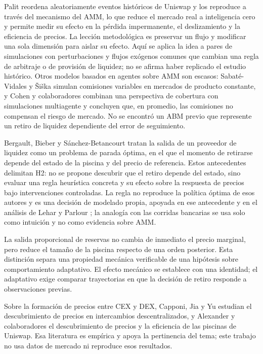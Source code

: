 Palit \cite{palit2022shuffled} reordena aleatoriamente eventos históricos de Uniswap y los reproduce a través del mecanismo del AMM, lo que reduce el mercado real a inteligencia cero y permite medir su efecto en la pérdida impermanente, el deslizamiento y la eficiencia de precios. La lección metodológica es preservar un flujo y modificar una sola dimensión para aislar su efecto. Aquí se aplica la idea a pares de simulaciones con perturbaciones y flujos exógenos comunes que cambian una regla de arbitraje o de provisión de liquidez; no se afirma haber replicado el estudio histórico. Otros modelos basados en agentes sobre AMM son escasos: Sabaté-Vidales y Šiška \cite{sabatevidales2023variable} simulan comisiones variables en mercados de producto constante, y Cohen y colaboradores \cite{cohen2023inefficiency} combinan una perspectiva de cobertura con simulaciones multiagente y concluyen que, en promedio, las comisiones no compensan el riesgo de mercado. No se encontró un ABM previo que represente un retiro de liquidez dependiente del error de seguimiento.

Bergault, Bieber y Sánchez-Betancourt \cite{bergault2025exit} tratan la salida de un proveedor de liquidez como un problema de parada óptima, en el que el momento de retirarse depende del estado de la piscina y del precio de referencia. Estos antecedentes delimitan H2: no se propone descubrir que el retiro depende del estado, sino evaluar una regla heurística concreta y su efecto sobre la respuesta de precios bajo intervenciones controladas. La regla no reproduce la política óptima de esos autores y es una decisión de modelado propia, apoyada en ese antecedente y en el análisis de Lehar y Parlour \cite{lehar2025uniswap}; la analogía con las corridas bancarias \cite{diamond1983bank} se usa solo como intuición y no como evidencia sobre AMM.

La salida proporcional de reservas no cambia de inmediato el precio marginal, pero reduce el tamaño de la piscina respecto de una orden posterior. Esta distinción separa una propiedad mecánica verificable de una hipótesis sobre comportamiento adaptativo. El efecto mecánico se establece con una identidad; el adaptativo exige comparar trayectorias en que la decisión de retiro responde a observaciones previas.

Sobre la formación de precios entre CEX y DEX, Capponi, Jia y Yu \cite{capponi2026price} estudian el descubrimiento de precios en intercambios descentralizados, y Alexander y colaboradores \cite{alexander2025price} el descubrimiento de precios y la eficiencia de las piscinas de Uniswap. Esa literatura es empírica y apoya la pertinencia del tema; este trabajo no usa datos de mercado ni reproduce esos resultados.

